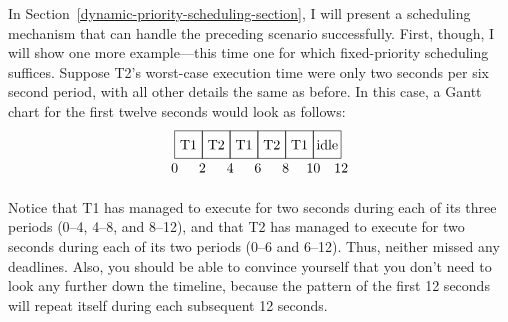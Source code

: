 In Section~\ref{dynamic-priority-scheduling-section}, I will present a scheduling mechanism
that can handle the preceding scenario successfully.
First, though, I will show one
more example---this time one for which fixed-priority scheduling
suffices.  Suppose T2's worst-case execution time were only two
seconds per six second period, with all other details the same as
before.  In this case, a Gantt chart for the first twelve seconds
would look as follows:
\[\begin{tikzpicture}[scale=.035]
\draw (0,0) rectangle (20,20);
\draw (20,0) rectangle (40,20);
\draw (40,0) rectangle (60,20);
\draw (60,0) rectangle (80,20);
\draw (80,0) rectangle (100,20);
\draw (100,0) rectangle (120,20);
\draw (10,10) node{T1};
\draw (30,10) node{T2};
\draw (50,10) node{T1};
\draw (70,10) node{T2};
\draw (90,10) node{T1};
\draw (110,10) node{idle};
\draw (0,-7) node{0};
\draw (20,-7) node{2};
\draw (40,-7) node{4};
\draw (60,-7) node{6};
\draw (80,-7) node{8};
\draw (100,-7) node{10};
\draw (120,-7) node{12};
\end{tikzpicture}\]

Notice that T1 has managed to execute for two seconds during each of
its three periods (0--4, 4--8, and 8--12), and that T2 has managed to
execute for two seconds during each of its two periods (0--6 and 6--12).
Thus, neither missed any deadlines.  Also, you should be able to
convince yourself that you don't need to look any further down the
timeline, because the pattern of the first 12 seconds will repeat
itself during each subsequent 12 seconds.

